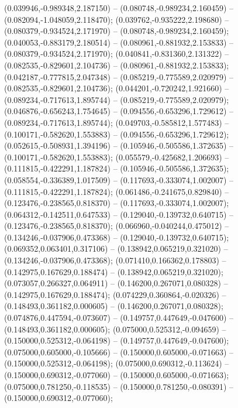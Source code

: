  (0.039946,-0.989348,2.187150) -- (0.080748,-0.989234,2.160459) -- (0.082094,-1.048059,2.118470);
 (0.039762,-0.935222,2.198680) -- (0.080379,-0.934524,2.171970) -- (0.080748,-0.989234,2.160459);
 (0.040053,-0.883179,2.180514) -- (0.080961,-0.881932,2.153833) -- (0.080379,-0.934524,2.171970);
 (0.040841,-0.831360,2.131322) -- (0.082535,-0.829601,2.104736) -- (0.080961,-0.881932,2.153833);
 (0.042187,-0.777815,2.047348) -- (0.085219,-0.775589,2.020979) -- (0.082535,-0.829601,2.104736);
 (0.044201,-0.720242,1.921660) -- (0.089234,-0.717613,1.895744) -- (0.085219,-0.775589,2.020979);
 (0.046876,-0.656243,1.754645) -- (0.094556,-0.653296,1.729612) -- (0.089234,-0.717613,1.895744);
 (0.049703,-0.585812,1.577483) -- (0.100171,-0.582620,1.553883) -- (0.094556,-0.653296,1.729612);
 (0.052615,-0.508931,1.394196) -- (0.105946,-0.505586,1.372635) -- (0.100171,-0.582620,1.553883);
 (0.055579,-0.425682,1.206693) -- (0.111815,-0.422291,1.187824) -- (0.105946,-0.505586,1.372635);
 (0.058554,-0.336389,1.017509) -- (0.117693,-0.333074,1.002007) -- (0.111815,-0.422291,1.187824);
 (0.061486,-0.241675,0.829840) -- (0.123476,-0.238565,0.818370) -- (0.117693,-0.333074,1.002007);
 (0.064312,-0.142511,0.647533) -- (0.129040,-0.139732,0.640715) -- (0.123476,-0.238565,0.818370);
 (0.066960,-0.040244,0.475012) -- (0.134246,-0.037906,0.473368) -- (0.129040,-0.139732,0.640715);
 (0.069352,0.063401,0.317106) -- (0.138942,0.065219,0.321020) -- (0.134246,-0.037906,0.473368);
 (0.071410,0.166362,0.178803) -- (0.142975,0.167629,0.188474) -- (0.138942,0.065219,0.321020);
 (0.073057,0.266327,0.064911) -- (0.146200,0.267071,0.080328) -- (0.142975,0.167629,0.188474);
 (0.074229,0.360864,-0.020326) -- (0.148493,0.361182,0.000605) -- (0.146200,0.267071,0.080328);
 (0.074876,0.447594,-0.073607) -- (0.149757,0.447649,-0.047600) -- (0.148493,0.361182,0.000605);
 (0.075000,0.525312,-0.094659) -- (0.150000,0.525312,-0.064198) -- (0.149757,0.447649,-0.047600);
 (0.075000,0.605000,-0.105666) -- (0.150000,0.605000,-0.071663) -- (0.150000,0.525312,-0.064198);
 (0.075000,0.690312,-0.113624) -- (0.150000,0.690312,-0.077060) -- (0.150000,0.605000,-0.071663);
 (0.075000,0.781250,-0.118535) -- (0.150000,0.781250,-0.080391) -- (0.150000,0.690312,-0.077060);

